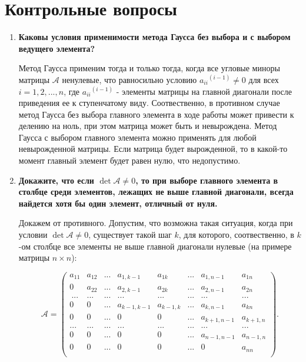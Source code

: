 \documentclass[12pt, a4paper]{article}
\begin{document}
\section{Контрольные вопросы}
\begin{enumerate}
 \item {\bf Каковы условия применимости метода Гаусса без выбора
и с выбором ведущего элемента?}

Метод Гаусса применим тогда и только тогда, когда все угловые миноры матрицы $\mathcal{A}$ ненулевые, что равносильно условию ${a_{ii}}^{(i-1)} \ne 0$ для всех $i = 1,2 , ..., n$, где ${a_{ii}}^{(i-1)}$ - элементы матрицы на главной диагонали после приведения ее к ступенчатому виду. Соотвественно, в противном случае метод Гаусса без выбора главного элемента в ходе работы может привести к делению на ноль, при этом матрица может быть и невырождена. Метод Гаусса с выбором главного элемента можно применять для любой невырожденной матрицы. Если матрица будет вырожденной, то в какой-то момент главный элемент будет равен нулю, что недопустимо. 

 \item {\bf Докажите, что если $\det \mathcal{A} \ne 0$, то при выборе главного
элемента в столбце среди элементов, лежащих не выше
главной диагонали, всегда найдется хотя бы один элемент,
отличный от нуля.}

Докажем от противного. Допустим, что возможна такая ситуация, когда при условии $\det \mathcal{A} \ne 0$, существует такой шаг $k$, для которого, соотвественно, в $k$-ом столбце все элементы не выше главной диагонали нулевые (на примере матрицы $n\times n$):

\[  \mathcal{A} = 
\begin{pmatrix}
a_{11} & a_{12} & ...& a_{1,k-1}&a_{1k}&...& a_{1, n-1} & a_{1n}\\
0 & a_{22} & ...& a_{2,k-1}&a_{2k} &...& a_{2, n-1} & a_{2n}\\\
... & ... & ...& ...& ... & ... & ... & ...\\
0 & 0 & ...& a_{k-1, k-1} &a_{k-1, k} & ... & a_{k, n-1}& a_{k n}\\
0 & 0 & ...& 0 &0 & ... & a_{k +1, n-1}& a_{k+1, n}\\
... & ... & ...& ... & ... & ... & ...&...\\
0 & 0 & ...& 0&0 & ... & a_{n-1, n-1} & a_{n-1, n}\\
0 & 0 & ...&0&0 & ... & 0 & a_{nn}\\
\end{pmatrix}.
\]


\end{enumerate}
\end{document}
